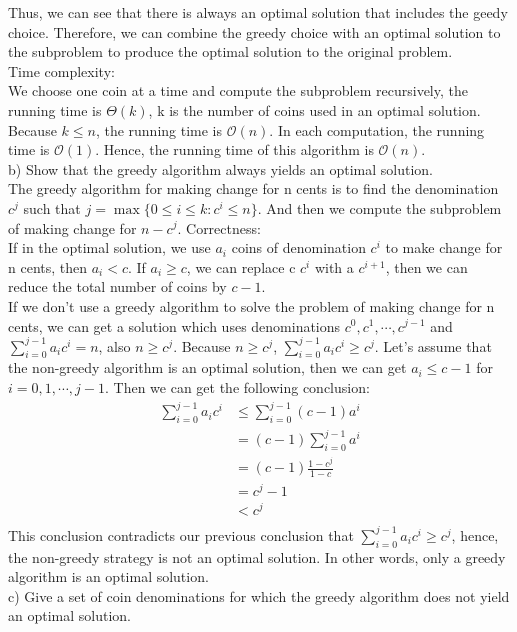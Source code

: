 \documentclass[12pt,letterpaper]{article}
\begin{document}
Thus, we can see that there is always an optimal solution that includes the geedy choice. Therefore, we can combine the greedy choice with an optimal solution to the subproblem to produce the optimal solution to the original problem. \\
Time complexity: \\
We choose one coin at a time and compute the subproblem recursively, the running time is $\Theta(k)$, k is the number of coins used in an optimal solution. Because $k \le n$, the running time is $\mathcal{O}(n)$. In each computation, the running time is $\mathcal{O}(1)$. Hence, the running time of this algorithm is $\mathcal{O}(n).$ \\ 
b) Show that the greedy algorithm always yields an optimal solution. \\
The greedy algorithm for making change for n cents is to find the denomination $c^j$ such that $j = \max \{0 \le i \le k: c^i \le n \}$. And then we compute the subproblem of making change for $n - c^j$. 
Correctness: \\
If in the optimal solution, we use $a_i$ coins of denomination $c^i$ to make change for n cents, then $a_i < c$. If $a_i \ge c$, we can replace c $c^i$ with a $c^{i+1}$, then we can reduce the total number of coins by $c-1$. \\
If we don't use a greedy algorithm to solve the problem of making change for n cents, we can get a solution which uses denominations $c^0,c^1,\cdots,c^{j-1}$ and $\sum _{i=0} ^{j-1} a_i c^i = n$, also $n \ge c^j$. Because $n \ge c^j$, $\sum _{i=0} ^{j-1} a_i c^i \ge c^j$. Let's assume that the non-greedy algorithm is an optimal solution, then we can get $a_i \le c-1$ for $i = 0,1,\cdots,j-1$. Then we can get the following conclusion: \\
\begin{align*}
\sum _{i=0} ^{j-1} a_i c^i &\le \sum _{i=0} ^{j-1} (c-1) a^i \\
&= (c-1) \sum _{i=0} ^{j-1} a^i \\
&= (c-1) \frac{1 - c^j}{1-c} \\
&= c^j - 1 \\
&< c^j \\
\end{align*}
This conclusion contradicts our previous conclusion that $\sum _{i=0} ^{j-1} a_i c^i \ge c^j$, hence, the non-greedy strategy is not an optimal solution. In other words, only a greedy algorithm is an optimal solution. \\
c) Give a set of coin denominations for which the greedy algorithm does not yield an optimal solution. \\
\end{document}
